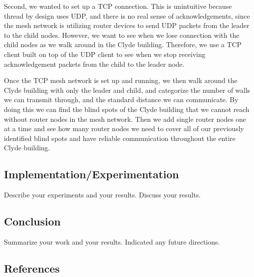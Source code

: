 \documentclass[letterpaper,twocolumn,10pt]{article}
\begin{document}
Second, we wanted to set up a TCP connection. This is unintuitive because thread by design uses UDP, and there is no real sense of acknowledgements, since the mesh network is utilizing router devices to send UDP packets from the leader to the child nodes. However, we want to see when we lose connection with the child nodes as we walk around in the Clyde building. Therefore, we use a TCP client built on top of the UDP client to see when we stop receiving acknowledgement packets from the child to the leader node. 

Once the TCP mesh network is set up and running, we then walk around the Clyde building with only the leader and child, and categorize the number of walls we can transmit through, and the standard distance we can communicate. By doing this we can find the blind spots of the Clyde building that we cannot reach without router nodes in the mesh network. Then we add single router nodes one at a time and see how many router nodes we need to cover all of our previously identified blind spots and have reliable communication throughout the entire Clyde building. 

\subsection*{Implementation/Experimentation}

Describe your experiments and your results. Discuss your results.

\subsection*{Conclusion}

Summarize your work and your results. Indicated any future directions.

\subsection*{References}

\printbibliography
\end{document}
